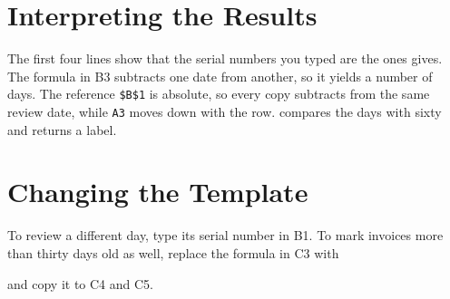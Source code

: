 \section{Interpreting the Results}
The first four lines show that the serial numbers you typed are the ones
 gives.  The formula in B3 subtracts one date from another, so it
yields a number of days.  The reference \texttt{\$B\$1} is absolute, so every
copy subtracts from the same review date, while \texttt{A3} moves down with
the row.   compares the days with sixty and returns a label.

\section{Changing the Template}
To review a different day, type its serial number in B1.  To mark invoices
more than thirty days old as well, replace the formula in C3 with
\begin{center}\end{center}
and copy it to C4 and C5.
